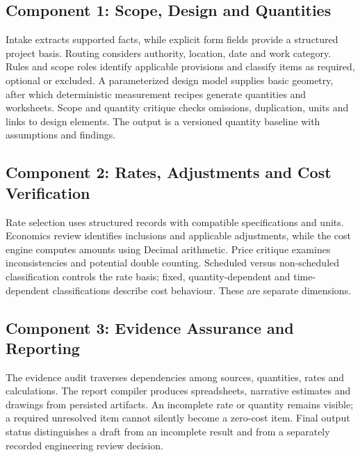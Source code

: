 \documentclass[11pt,a4paper]{article}
\begin{document}
\subsection{Component 1: Scope, Design and Quantities}
Intake extracts supported facts, while explicit form fields provide a structured project basis. Routing considers authority, location, date and work category. Rules and scope roles identify applicable provisions and classify items as required, optional or excluded. A parameterized design model supplies basic geometry, after which deterministic measurement recipes generate quantities and worksheets. Scope and quantity critique checks omissions, duplication, units and links to design elements. The output is a versioned quantity baseline with assumptions and findings.

\subsection{Component 2: Rates, Adjustments and Cost Verification}
Rate selection uses structured records with compatible specifications and units. Economics review identifies inclusions and applicable adjustments, while the cost engine computes amounts using Decimal arithmetic. Price critique examines inconsistencies and potential double counting. Scheduled versus non-scheduled classification controls the rate basis; fixed, quantity-dependent and time-dependent classifications describe cost behaviour. These are separate dimensions.

\subsection{Component 3: Evidence Assurance and Reporting}
The evidence audit traverses dependencies among sources, quantities, rates and calculations. The report compiler produces spreadsheets, narrative estimates and drawings from persisted artifacts. An incomplete rate or quantity remains visible; a required unresolved item cannot silently become a zero-cost item. Final output status distinguishes a draft from an incomplete result and from a separately recorded engineering review decision.
\end{document}
